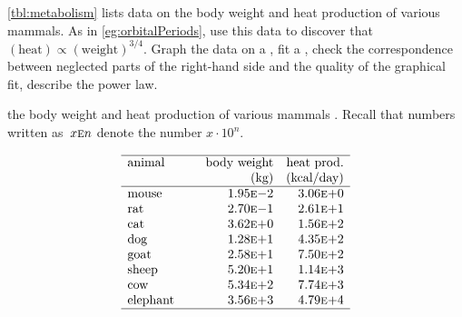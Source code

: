 \begin{exercise} \label{ex:metabolism} 
\autoref{tbl:metabolism} lists data on the body weight and heat 
production of various mammals. 
As in \autoref{eg:orbitalPeriods}, use this data to discover  that \((\text{heat})\propto(\text{weight})^{3/4}\).  
Graph the data on a , fit a , check the correspondence between neglected parts of the right-hand side and the quality of the graphical fit, describe the power law.
\setbox\ajrqrbox\hbox{}%
\marginajrbox%
\begin{table}
\caption{the body weight and heat production of various mammals \cite[]{Kleiber1947}.  Recall that numbers written as~\(x\textsc{e}n\) denote the number \(x\cdot10^n\).}
\label{tbl:metabolism}
\begin{equation*}
\begin{array}{p{12ex}rr} \hline
animal&\text{body weight}&\text{heat prod.}\\
&(\text{kg})&\text{(kcal/day)}\\\hline
mouse&   1.95\textsc{e}{-}2 & 3.06\textsc{e}{+}0 \\
rat  &   2.70\textsc{e}{-}1 & 2.61\textsc{e}{+}1 \\
cat  &   3.62\textsc{e}{+}0 & 1.56\textsc{e}{+}2 \\
dog  &   1.28\textsc{e}{+}1 & 4.35\textsc{e}{+}2 \\
goat &   2.58\textsc{e}{+}1 & 7.50\textsc{e}{+}2 \\
sheep&   5.20\textsc{e}{+}1 & 1.14\textsc{e}{+}3 \\
cow  &   5.34\textsc{e}{+}2 & 7.74\textsc{e}{+}3 \\
elephant&3.56\textsc{e}{+}3 & 4.79\textsc{e}{+}4 \\
\hline
\end{array}
\end{equation*}
\end{table}%
\end{exercise}




